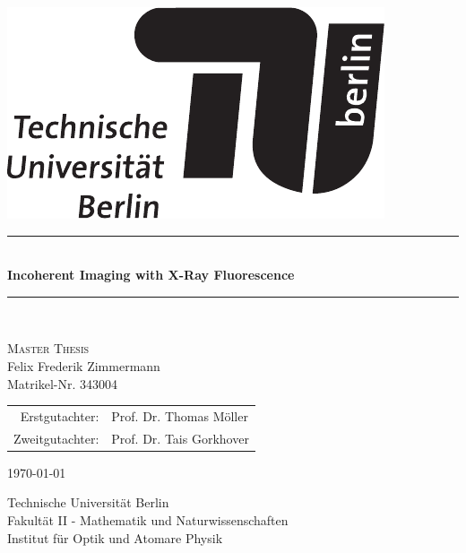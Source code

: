 \begin{titlepage}
		
	\begin{center}
				
				
		\begin{flushright}
			\includegraphics[width=.3\textwidth]{images/TU_Logo.pdf}\\[2.5cm]    
			\end{flushright}
					
					
			{\newcommand{\HRule}{\rule{\linewidth}{0.5mm}}
				\HRule \\[0.4cm]
				\LARGE{\bfseries Incoherent Imaging with X-Ray Fluorescence}\\
							
				\HRule \\[1.5cm]}
			\textsc{\Large Master Thesis}\\[0.5cm]
					
			
			Felix Frederik Zimmermann\\
			Matrikel-Nr. 343004\\[0.5cm]
			
			\begin{table}[h]
				\centering
				\begin{tabular}{rl}
					Erstgutachter:& Prof. Dr. Thomas Möller\\
					Zweitgutachter:& Prof. Dr. Tais Gorkhover\\
				\end{tabular}
			\end{table}		
			{\large \today}
			
			\vfill
					
			Technische Universität Berlin\\
			Fakultät II - Mathematik und Naturwissenschaften\\
			Institut für Optik und Atomare Physik\\					
		\end{center}
			
	\end{titlepage}